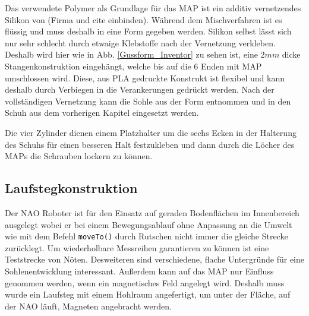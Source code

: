 Das verwendete Polymer als Grundlage für das MAP ist ein additiv vernetzendes Silikon von (Firma und cite einbinden). Während dem Mischverfahren ist es flüssig und muss deshalb in eine Form gegeben werden. Silikon selbst lässt sich nur sehr schlecht durch etwaige Klebstoffe nach der Vernetzung verkleben. Deshalb wird hier wie in Abb. \ref{Gussform_Inventor} zu sehen ist, eine $2\unit{mm}$ dicke Stangenkonstruktion eingehängt, welche bis auf die 6 Enden mit MAP umschlossen wird. Diese, aus PLA gedruckte Konstrukt ist flexibel und kann deshalb durch Verbiegen in die Verankerungen gedrückt werden. Nach der vollständigen Vernetzung kann die Sohle aus der Form entnommen und in den Schuh aus dem vorherigen Kapitel eingesetzt werden. 

Die vier Zylinder dienen einem Platzhalter um die sechs Ecken in der Halterung des Schuhs für einen besseren Halt festzukleben und dann durch die Löcher des MAPs die Schrauben lockern zu können. 

\subsection{Laufstegkonstruktion} \FloatBarrier
Der NAO Roboter ist für den Einsatz auf geraden Bodenflächen im Innenbereich ausgelegt wobei er bei einem Bewegungsablauf ohne Anpassung an die Umwelt wie mit dem Befehl \texttt{moveTo()} durch Rutschen nicht immer die gleiche Strecke zurücklegt. 
Um wiederholbare Messreihen garantieren zu können ist eine Teststrecke von Nöten. Desweiteren sind verschiedene, flache Untergründe für eine Sohlenentwicklung interessant.
Außerdem kann auf das MAP nur Einfluss genommen werden, wenn ein magnetisches Feld angelegt wird. Deshalb muss wurde ein Laufsteg mit einem Hohlraum angefertigt, um unter der Fläche, auf der NAO läuft, Magneten angebracht werden. 

